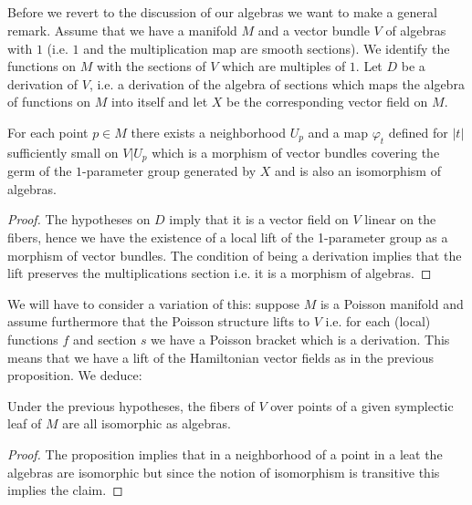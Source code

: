 \subsection{}\label{art4-subsec-4.1}
Before we revert to the discussion of our algebras we want to make a general remark. Assume that we have a manifold $M$ and a vector bundle $V$ of algebras with $1$ (i.e. $1$ and the multiplication map are smooth sections). We identify the functions on $M$ with the sections of $V$ which are multiples of $1$.
Let $D$ be a derivation of $V$, i.e. a derivation of the algebra of sections which maps the algebra of functions on $M$ into itself and  let $X$ be the corresponding vector field on $M$. 

\begin{prop*}
For each point $p\in M $ there exists a neighborhood $U_{p}$ and a map $\varphi_{t}$ defined for $|t|$ sufficiently small on $V|U_{p}$ which is a morphism of vector bundles covering the germ of the $1$-parameter group generated by $X$ and is also an isomorphism of algebras.
\end{prop*}

\begin{proof}
The hypotheses on $D$ imply that it is a vector field on $V$ linear on the fibers, hence we have the existence of a local lift of the 1-parameter group as a morphism of vector bundles. The condition of being a derivation implies that the lift preserves the multiplications section i.e. it is a morphism of algebras.
\end{proof}

We will have to consider a variation of this: suppose $M$ is a Poisson manifold and assume furthermore that the Poisson structure lifts to $V$ i.e. for each (local) functions $f$ and section $s$ we have a  Poisson bracket which is a derivation. This means that we have a lift of the Hamiltonian vector fields as in the previous proposition. We deduce: 

\begin{coro*}
Under the previous hypotheses, the fibers of $V$ over points of a given symplectic leaf of $M$ are all isomorphic as algebras. 
\end{coro*}

\begin{proof}
The proposition implies that in a neighborhood of a point  in a leat the algebras are isomorphic but since the notion of isomorphism is transitive this implies the claim.
\end{proof}

